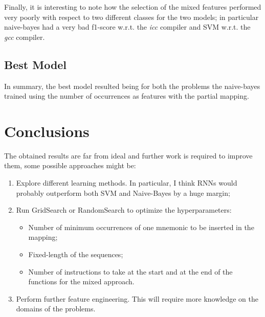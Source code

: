 \documentclass[a4paper]{article}
\begin{document}
Finally, it is interesting to note how the selection of the mixed features performed very poorly with respect to two different classes for the two models; in particular naive-bayes had a very bad f1-score w.r.t. the \textit{icc} compiler and SVM w.r.t. the \textit{gcc} compiler.

\subsection{Best Model}
In summary, the best model resulted being for both the problems the naive-bayes trained using the number of occurrences as features with the partial mapping.

\section{Conclusions}
The obtained results are far from ideal and further work is required to improve them, some possible approaches might be:
\begin{enumerate}
\item Explore different learning methods. In particular, I think RNNs would probably outperform both SVM and Naive-Bayes by a huge margin;
\item Run GridSearch or RandomSearch to optimize the hyperparameters:
\begin{itemize}
\item Number of minimum occurrences of one mnemonic to be inserted in the mapping;
\item Fixed-length of the sequences;
\item Number of instructions to take at the start and at the end of the functions for the mixed approach.
\end{itemize}
\item Perform further feature engineering. This will require more knowledge on the domains of the problems.
\end{enumerate}
\end{document}
